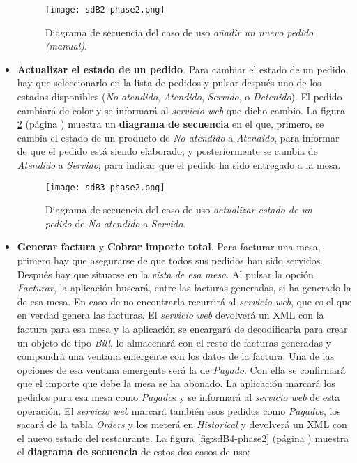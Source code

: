 \begin{itemize}
  \begin{figure}[!h]
    \begin{center}
      \texttt{[image: sdB2-phase2.png]}
      \caption{Diagrama de secuencia del caso de uso \emph{añadir un nuevo
      pedido (manual)}.}
      \label{fig:sdB2-phase2}
    \end{center}
  \end{figure}

\item \textbf{Actualizar el estado de un pedido}. Para cambiar el estado de
un pedido, hay que seleccionarlo en la lista de pedidos y pulsar después uno
de los estados disponibles (\emph{No atendido}, \emph{Atendido},
\emph{Servido}, o \emph{Detenido}). El pedido cambiará de color y se informará
al \emph{servicio web} que dicho cambio.
La figura \ref{fig:sdB3-phase2} (página \pageref{fig:sdB3-phase2}) muestra
un \textbf{diagrama de secuencia} en el que, primero, se cambia el estado de
un producto de \emph{No atendido} a \emph{Atendido}, para informar de que
el pedido está siendo elaborado; y posteriormente se cambia de \emph{Atendido}
a \emph{Servido}, para indicar que el pedido ha sido entregado a la mesa.

  \begin{figure}[!h]
    \begin{center}
      \texttt{[image: sdB3-phase2.png]}
      \caption{Diagrama de secuencia del caso de uso \emph{actualizar
      estado de un pedido} de \emph{No atendido} a \emph{Servido}.}
      \label{fig:sdB3-phase2}
    \end{center}
  \end{figure}

\item \textbf{Generar factura} y  \textbf{Cobrar importe total}. Para
facturar una mesa, primero hay que asegurarse de que todos sus pedidos han
sido servidos. Después hay que situarse en la \emph{vista de esa mesa}.
Al pulsar la opción \emph{Facturar}, la aplicación buscará, entre las facturas
generadas, si ha generado la de esa mesa. En caso de no encontrarla recurrirá
al \emph{servicio web}, que es el que en verdad genera las facturas. El
\emph{servicio web} devolverá un \acs{XML} con la factura para esa mesa y la 
aplicación se encargará de decodificarla para crear un objeto de tipo
\emph{Bill}, lo almacenará con el resto de facturas generadas y compondrá
una ventana emergente con los datos de la factura. Una de las opciones de
esa ventana emergente será la de \emph{Pagado}. Con ella se confirmará que
el importe que debe la mesa se ha abonado. La aplicación marcará los
pedidos para esa mesa como \emph{Pagado}s y se informará al \emph{servicio
web} de esta operación. El \emph{servicio web} marcará también esos pedidos
como \emph{Pagado}s, los sacará de la tabla \emph{Orders} y los meterá en
\emph{Historical} y devolverá un \acs{XML} con el nuevo estado del
restaurante. La figura \ref{fig:sdB4-phase2} (página \pageref{fig:sdB4-phase2})
muestra el \textbf{diagrama de secuencia} de estos dos casos de uso:


\end{itemize}
